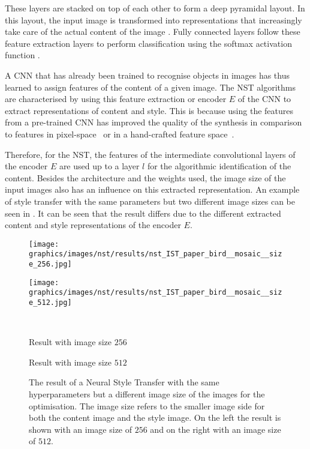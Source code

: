 These layers are stacked on top of each other to form a deep pyramidal layout. In this layout, the input image is transformed into representations that increasingly take care of the actual content of the image \cite{ZF2014}. Fully connected layers follow these feature extraction layers to perform classification using the softmax activation function \cite{Alp2020}. 

A \gls{CNN} that has already been trained to recognise objects in images has thus learned to assign features of the content of a given image. The \gls{NST} algorithms are characterised by using this feature extraction or encoder $E$ of the \gls{CNN} to extract representations of content and style. This is because using the features from a pre-trained \gls{CNN} has improved the quality of the synthesis in comparison to features in pixel-space~\cite{EL1999} or in a hand-crafted feature space~\cite{PS2000}. 

Therefore, for the \gls{NST}, the features of the intermediate convolutional layers of the encoder $E$ are used up to a layer $l$ for the algorithmic identification of the content. Besides the architecture and the weights used, the image size of the input images also has an influence on this extracted representation. An example of style transfer with the same parameters but two different image sizes can be seen in . It can be seen that the result differs due to the different extracted content and style representations of the encoder $E$.
\begin{figure}[h]
	\centering
	\begin{minipage}{.5\textwidth}
		\centering
		\texttt{[image: graphics/images/nst/results/nst\_IST\_paper\_bird\_\_mosaic\_\_size\_256.jpg]}
	\end{minipage}%
	\begin{minipage}{.5\textwidth}
		\centering
		\texttt{[image: graphics/images/nst/results/nst\_IST\_paper\_bird\_\_mosaic\_\_size\_512.jpg]}
	\end{minipage}\\ \vspace{0.15cm}
	\begin{minipage}{.5\textwidth}
		\centering
		Result with image size $256$
	\end{minipage}%
	\begin{minipage}{.5\textwidth}
		\centering
		Result with image size $512$
	\end{minipage}
	\caption{The result of a Neural Style Transfer with the same hyperparameters but a different image size of the images for the optimisation. The image size refers to the smaller image side for both the content image and the style image. On the left the result is shown with an image size of $256$ and on the right with an image size of $512$.}
	\label{fig:diff_size_nst}
\end{figure}

